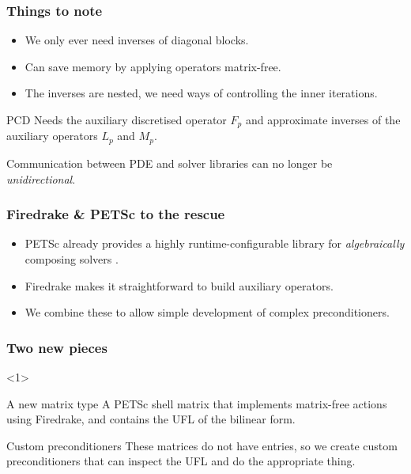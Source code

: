 \documentclass[presentation]{beamer}
\begin{document}
\begin{frame}
  \frametitle{Things to note}

  \begin{itemize}
  \item We only ever need inverses of diagonal blocks.
  \item Can save memory by applying operators matrix-free.
  \item The inverses are nested, we need ways of controlling the inner
    iterations.
  \end{itemize}

  \begin{block}{PCD}
    Needs the auxiliary discretised operator $F_p$ and approximate
    inverses of the auxiliary operators $L_p$ and $M_p$.

    Communication between PDE and solver libraries can no longer be
    \emph{unidirectional}.
  \end{block}
\end{frame}

\begin{frame}
  \frametitle{Firedrake \& PETSc to the rescue}
  \begin{itemize}
  \item PETSc already provides a highly runtime-configurable library
    for \emph{algebraically} composing solvers \parencite{Brown:2012}.

  \item Firedrake makes it straightforward to build auxiliary
    operators.

  \item We combine these to allow simple development of complex
    preconditioners.
  \end{itemize}
\end{frame}

\begin{frame}
  \frametitle{Two new pieces}
 
  \begin{onlyenv}<1>
    \begin{block}{A new matrix type}
      A PETSc shell matrix that implements matrix-free actions using
      Firedrake, and contains the UFL of the bilinear form.
    \end{block}
    
    \begin{block}{Custom preconditioners}
      These matrices do not have entries, so we create custom
      preconditioners that can inspect the UFL and do the appropriate
      thing.
    \end{block}
  \end{onlyenv}
\end{frame}
\end{document}
